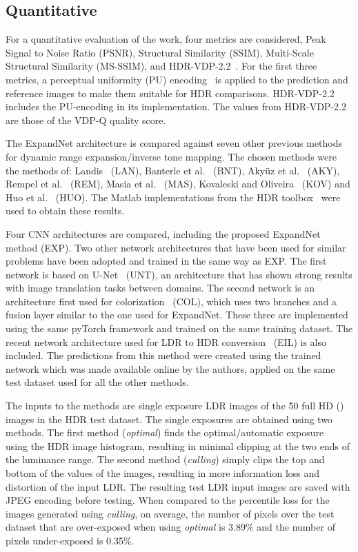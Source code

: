 \documentclass{egpubl}
\begin{document}
\subsection{\textbf{Quantitative}}

For a quantitative evaluation of the work, four metrics are considered, Peak
Signal to Noise Ratio (PSNR), Structural Similarity (SSIM), Multi-Scale
Structural Similarity (MS-SSIM), and  HDR-VDP-2.2~\cite{narwaria2015hdrvdp}.
For the first three metrics, a perceptual uniformity (PU)
encoding~\cite{aydin2008} is applied to the prediction and reference images to
make them suitable for HDR comparisons. HDR-VDP-2.2 includes the PU-encoding in
its implementation. The values from HDR-VDP-2.2 are those of the VDP-Q quality
score.

The ExpandNet architecture is compared against seven other previous methods for
dynamic range expansion/inverse tone mapping. The chosen methods were the
methods of: Landis~\cite{Landis02} (LAN), Banterle et
al.~\cite{banterle06inverse} (BNT), Aky\"{u}z et al.~\cite{akyuz06} (AKY),
Rempel et al.~\cite{rempel06ldr2hdr} (REM),  Masia et al.~\cite{masia09}
(MAS), Kovaleski and Oliveira~\cite{Kovaleski+2014} (KOV) and Huo et
al.~\cite{Huo+2014} (HUO). The Matlab implementations from the HDR
toolbox~\cite{banterle2011hdrbook} were used to obtain these results.

Four CNN architectures are compared, including the proposed ExpandNet method
(EXP). Two other network architectures that have been used for
similar problems have been adopted and trained in the same way as EXP. The first
network is based on U-Net~\cite{ronneberger2015unet} (UNT), an architecture
that has shown strong results with image translation tasks between domains. The
second network is an architecture first used for
colorization~\cite{iizuka2016colornet} (COL), which uses two branches and a
fusion layer similar to the one used for ExpandNet. These three are implemented
using the same pyTorch framework and trained on the same training dataset. The
recent network architecture used for LDR to HDR
conversion~\cite{eilertsen2017cnn} (EIL) is also included. The predictions
from this method were created using the trained network which was made
available online by the authors, applied on the same test dataset used for all
the other methods.

The inputs to the methods are single exposure LDR images of the 50 full HD
() images in the HDR test dataset. The single exposures are
obtained using two methods. The first method (\textit{optimal}) finds the
optimal/automatic exposure~\cite{debattista2015optimal} using the HDR image
histogram, resulting in minimal clipping at the two ends of the luminance
range. The second method (\textit{culling}) simply clips the top and bottom
 of the values of the images, resulting in more information loss and
distortion of the input LDR. The resulting test LDR input images are saved with
JPEG encoding before testing. When compared to the  percentile
loss for the images generated using \textit{culling}, on average, the number of
pixels over the test dataset that are over-exposed when using \textit{optimal}
is 3.89\% and the number of pixels under-exposed is 0.35\%.
\end{document}
